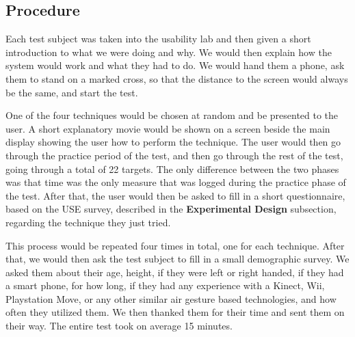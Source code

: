 \subsection{Procedure}

Each test subject was taken into the usability lab and then given a short introduction to what we were doing and why. We would then explain how the system would work and what they had to do. We would hand them a phone, ask them to stand on a marked cross, so that the distance to the screen would always be the same, and start the test.

One of the four techniques would be chosen at random and be presented to the user. A short explanatory movie would be shown on a screen beside the main display showing the user how to perform the technique. The user would then go through the practice period of the test, and then go through the rest of the test, going through a total of 22 targets. The only difference between the two phases was that time was the only measure that was logged during the practice phase of the test. After that, the user would then be asked to fill in a short questionnaire, based on the USE survey, described in the \textbf{Experimental Design} subsection, regarding the technique they just tried. 

This process would be repeated four times in total, one for each technique. After that, we would then ask the test subject to fill in a small demographic survey. We asked them about their age, height, if they were left or right handed, if they had a smart phone, for how long, if they had any experience with a Kinect, Wii, Playstation Move, or any other similar air gesture based technologies, and how often they utilized them. We then thanked them for their time and sent them on their way. The entire test took on average 15 minutes. 